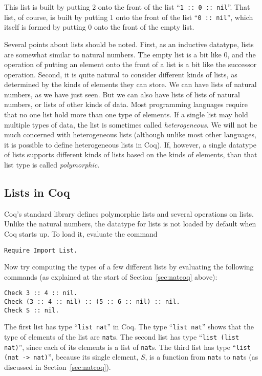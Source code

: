 \documentclass{book}[12pt]
\begin{document}
\noindent This list is built by putting $2$ onto the front of the list
``\texttt{1 :: 0 :: nil}''.  That list, of course, is built by putting
$1$ onto the front of the list ``\texttt{0 :: nil}'', which itself is
formed by putting $0$ onto the front of the empty list.

Several points about lists should be noted.  First, as an inductive
datatype, lists are somewhat similar to natural numbers.  The empty
list is a bit like $0$, and the operation of putting an element onto
the front of a list is a bit like the successor operation.  Second, it
is quite natural to consider different kinds of lists, as determined
by the kinds of elements they can store.  We can have lists of natural
numbers, as we have just seen.  But we can also have lists of lists of
natural numbers, or lists of other kinds of data.  Most programming
languages require that no one list hold more than one type of
elements.  If a single list may hold multiple types of data, the list
is sometimes called \emph{heterogeneous}.  We will not be much
concerned with heterogeneous lists (although unlike most other
languages, it is possible to define heterogeneous lists in Coq).  If,
however, a single datatype of lists supports different kinds of lists
based on the kinds of elements, than that list type is called
\emph{polymorphic}.

\subsection{Lists in Coq}

Coq's standard library defines polymorphic lists and several
operations on lists.  Unlike the natural numbers, the datatype for
lists is not loaded by default when Coq starts up.  To load it,
evaluate the command

\begin{verbatim}
Require Import List.
\end{verbatim}

\noindent Now try computing the types of a few different lists by
evaluating the following commands (as explained at the start of
Section~\ref{sec:natcoq} above):

\begin{verbatim}
Check 3 :: 4 :: nil.
Check (3 :: 4 :: nil) :: (5 :: 6 :: nil) :: nil.
Check S :: nil.
\end{verbatim}

\noindent The first list has type ``\texttt{list nat}'' in Coq.  The
type ``\texttt{list nat}'' shows that the type of elements of the list
are \texttt{nat}s.  The second list has type ``\texttt{list (list
nat)}'', since each of its elements is a list of \texttt{nat}s.  The
third list has type ``\texttt{list (nat -> nat)}'', because its single
element, $S$, is a function from \texttt{nat}s to \texttt{nat}s (as
discussed in Section~\ref{sec:natcoq}).
\end{document}
